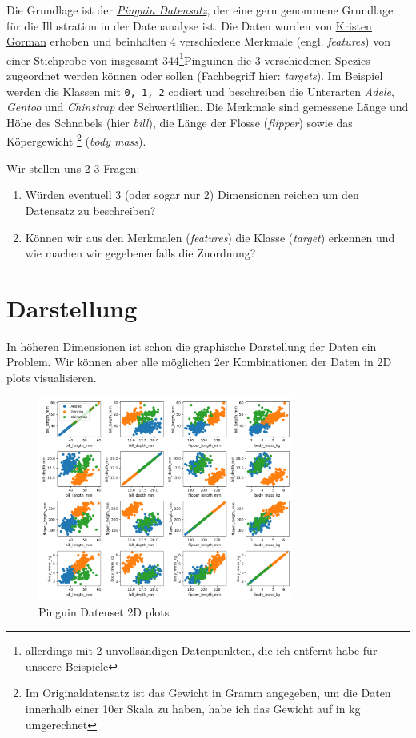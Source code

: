 \documentclass[]{book}
\providecommand{\tightlist}{%
  \setlength{\itemsep}{0pt}\setlength{\parskip}{0pt}}
\theoremstyle{definition}
\theoremstyle{definition}
\theoremstyle{definition}
\theoremstyle{definition}
\theoremstyle{remark}
\begin{document}
Die Grundlage ist der \href{https://allisonhorst.github.io/palmerpenguins/}{\emph{Pinguin Datensatz}}, der eine gern genommene Grundlage für die Illustration in der Datenanalyse ist. Die Daten wurden von \href{https://www.uaf.edu/cfos/people/faculty/detail/kristen-gorman.php}{Kristen Gorman} erhoben und beinhalten 4 verschiedene Merkmale (engl. \emph{features}) von einer Stichprobe von insgesamt 344\footnote{allerdings mit 2 unvollsändigen Datenpunkten, die ich entfernt habe für unseere Beispiele}Pinguinen die 3 verschiedenen Spezies zugeordnet werden können oder sollen (Fachbegriff hier: \emph{targets}). Im Beispiel werden die Klassen mit \texttt{0,\ 1,\ 2} codiert und beschreiben die Unterarten \emph{Adele}, \emph{Gentoo} und \emph{Chinstrap} der Schwertlilien. Die Merkmale sind gemessene Länge und Höhe des Schnabels (hier \emph{bill}), die Länge der Flosse (\emph{flipper}) sowie das Köpergewicht \footnote{Im Originaldatensatz ist das Gewicht in Gramm angegeben, um die Daten innerhalb einer 10er Skala zu haben, habe ich das Gewicht auf in kg umgerechnet}
(\emph{body mass}).

Wir stellen uns 2-3 Fragen:

\begin{enumerate}
\def\labelenumi{\arabic{enumi}.}
\tightlist
\item
  Würden eventuell 3 (oder sogar nur 2) Dimensionen reichen um den Datensatz zu beschreiben?
\item
  Können wir aus den Merkmalen (\emph{features}) die Klasse (\emph{target}) erkennen und wie machen wir gegebenenfalls die Zuordnung?
\end{enumerate}

\hypertarget{darstellung}{%
\section{Darstellung}\label{darstellung}}

In höheren Dimensionen ist schon die graphische Darstellung der Daten ein Problem. Wir können aber alle möglichen 2er Kombinationen der Daten in 2D plots visualisieren.

\begin{figure}
\hypertarget{fig:05-penguin-allpairs}{%
\centering
\includegraphics[width=0.75\textwidth,height=\textheight]{bilder/05-all-pairs.png}
\caption{Pinguin Datenset 2D plots}\label{fig:05-penguin-allpairs}
}
\end{figure}
\end{document}
